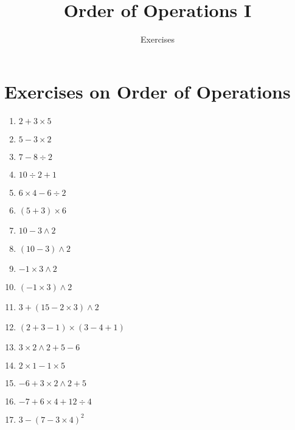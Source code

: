 \documentclass[11pt]{article}
\title{Order of Operations I}
\author{Exercises}
\begin{document}
\maketitle
\section{Exercises on Order of Operations}
\begin{enumerate}
	\item $2+3\times 5$
	\item $5 - 3 \times 2$
	\item $7 - 8 \div 2$
	\item $10 \div 2 + 1$
	\item $6 \times 4 - 6 \div 2$
	\item $(5 + 3)\times 6$
	\item $10 - 3 \wedge 2$
	\item $(10 - 3) \wedge 2 $
	\item $-1 \times 3 \wedge 2$
	\item $(-1 \times 3) \wedge 2$
	\item $3 + (15 - 2 \times 3)\wedge 2$
	\item $(2+3-1)\times (3-4+1)$
	\item $3 \times 2 \wedge 2 + 5 - 6$
	\item $2 \times 1 - 1 \times 5$
	\item $-6 + 3 \times 2 \wedge 2 + 5$
	\item $-7+6 \times 4 + 12 \div 4$
	\item $3 - (7 - 3\times 4)^2$
\end{enumerate}
\newpage
\end{document}
